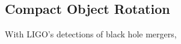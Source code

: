 {\color{orange}

\subsection{Compact Object Rotation}

With LIGO's detections of black hole mergers, 

}
